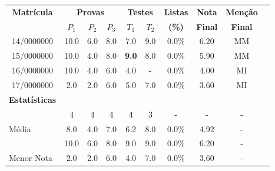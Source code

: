 \begin{longtable}{cccccccccc}
\toprule
\multirow{2}{*}{\textbf{Matrícula}} & \multicolumn{3}{c}{\textbf{Provas}} & \multicolumn{2}{c}{\textbf{Testes}} & \textbf{Listas} & \textbf{Nota} & \textbf{Menção} \\
 & \textbf{$P_1$} & \textbf{$P_2$} & \textbf{$P_3$} & \textbf{$T_1$} & \textbf{$T_2$} & \textbf{(\%)} & \textbf{Final} & \textbf{Final} \\
\toprule
\rowcolor[gray]{.9}
14/0000000 & 10.0 & 6.0 & 8.0 & 7.0 & 9.0 & 0.0\% & 6.20 & MM \\
15/0000000 & 10.0 & 4.0 & 8.0 & \textbf{9.0} & 8.0 & 0.0\% & 5.90 & MM \\
\rowcolor[gray]{.9}
16/0000000 & 10.0 & 4.0 & 6.0 & 4.0 & - & 0.0\% & 4.00 & MI \\
17/0000000 & 2.0 & 2.0 & 6.0 & 5.0 & 7.0 & 0.0\% & 3.60 & MI \\
\toprule
\textbf{Estatísticas} & \multicolumn{9}{c}{} \\
\toprule
\rowcolor[gray]{.9}
\multicolumn{1}{l}{Presentes} & 4 & 4 & 4 & 4 & 3 & - & - & - \\
\multicolumn{1}{l}{Média} & 8.0 & 4.0 & 7.0 & 6.2 & 8.0 & 0.0\% & 4.92 & - \\
\rowcolor[gray]{.9}
\multicolumn{1}{l}{Maior Nota} & 10.0 & 6.0 & 8.0 & 9.0 & 9.0 & 0.0\% & 6.20 & - \\
\multicolumn{1}{l}{Menor Nota} & 2.0 & 2.0 & 6.0 & 4.0 & 7.0 & 0.0\% & 3.60 & - \\
\bottomrule
\end{longtable}

\let\thefootnote\relax{}
